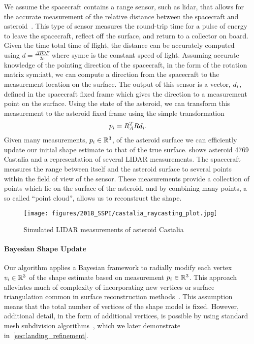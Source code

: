 \documentclass[letterpaper, paper,11pt]{AAS}		%
\begin{document}
We assume the spacecraft contains a range sensor, such as \gls{lidar}, that allows for the accurate measurement of the relative distance between the spacecraft and asteroid~\cite{zuber1997,zuber2000}.
This type of sensor measures the round-trip time for a pulse of energy to leave the spacecraft, reflect off the surface, and return to a collector on board.
Given the time total time of flight, the distance can be accurately computed using \( d = \frac{\Delta TOF}{2 c} \) where \gls{sym:c} is the constant speed of light.
Assuming accurate knowledge of the pointing direction of the spacecraft, in the form of the rotation matrix \gls{sym:iatt}, we can compute a direction from the spacecraft to the measurement location on the surface.
The output of this sensor is a vector, \( d_i \), defined in the spacecraft fixed frame which gives the direction to a measurement point on the surface. 
Using the state of the asteroid, we can transform this measurement to the asteroid fixed frame using the simple transformation
\begin{align*}
    p_i = R_A^T R d_i .
\end{align*}
Given many measurements, \( p_i \in \mathbb{R}^3 \), of the asteroid surface we can efficiently update our initial shape estimate to that of the true surface.
 shows asteroid 4769 Castalia and a representation of several LIDAR measurements. 
The spacecraft measures the range between itself and the asteroid surface to several points within the field of view of the sensor. 
These measurements provide a collection of points which lie on the surface of the asteroid, and by combining many points, a so called ``point cloud'', allows us to reconstruct the shape.
\begin{figure}
    \centering
    \texttt{[image: figures/2018\_SSPI/castalia\_raycasting\_plot.jpg]}
    \caption{Simulated LIDAR measurements of asteroid Castalia~\label{fig:lidar_example}}
\end{figure}

\paragraph{Bayesian Shape Update}

Our algorithm applies a Bayesian framework to radially modify each vertex \( v_i \in \mathbb{R}^3\) of the shape estimate based on measurement \( p_i \in \mathbb{R}^3 \). 
This approach alleviates much of complexity of incorporating new vertices or surface triangulation common in surface reconstruction methods~\cite{berg2008}.
This assumption means that the total number of vertices of the shape model is fixed.
However, additional detail, in the form of additional vertices, is possible by using standard mesh subdivision algorithms~\cite{orourke1998}, which we later demonstrate in~\cref{sec:landing_refinement}.
\end{document}
